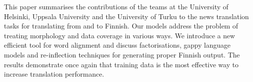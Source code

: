 This paper summarises the contributions of the teams at the University of Helsinki, Uppsala University and the University of Turku to the news translation tasks for translating from and to Finnish. Our models address the problem of treating morphology and data coverage in various ways. We introduce a new efficient tool for word alignment and discuss factorisations, gappy language models and re-inflection techniques for generating proper Finnish output. The results demonstrate once again that training data is the most effective way to increase translation performance.
